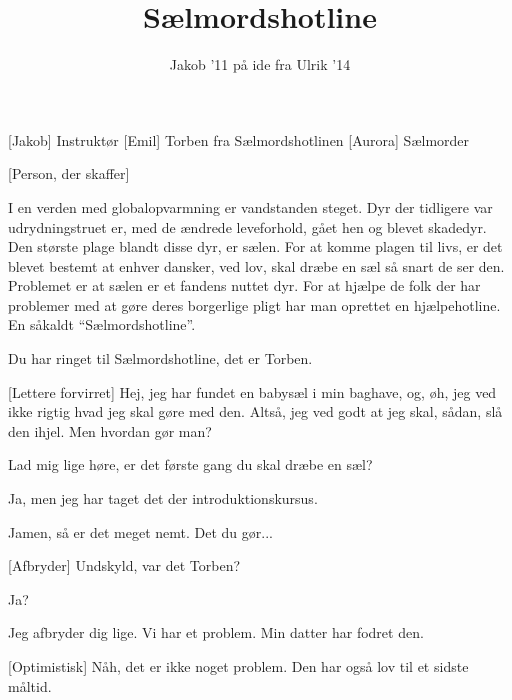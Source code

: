 \documentclass[a4paper,11pt]{article}
\title{Sælmordshotline}
\author{Jakob '11 på ide fra Ulrik '14}
\begin{document}
\maketitle

\begin{roles}
[Jakob] Instruktør
[Emil] Torben fra Sælmordshotlinen
[Aurora] Sælmorder
\end{roles}

\begin{props}
[Person, der skaffer]
\end{props}


\begin{sketch}


 I en verden med globalopvarmning er vandstanden steget. Dyr der tidligere var udrydningstruet er, med de ændrede leveforhold, gået hen og blevet skadedyr. 
Den største plage blandt disse dyr, er sælen. For at komme plagen til livs, er det blevet bestemt at enhver dansker, ved lov, skal dræbe en sæl så snart de ser den. Problemet er at sælen er et fandens nuttet dyr. For at hjælpe de folk der har problemer med at gøre deres borgerlige pligt har man oprettet en hjælpehotline. En såkaldt “Sælmordshotline”.


 Du har ringet til Sælmordshotline, det er Torben.

[Lettere forvirret] Hej, jeg har fundet en babysæl i min baghave, og, øh, jeg ved ikke rigtig hvad jeg skal gøre med den. Altså, jeg ved godt at jeg skal, sådan, slå den ihjel. Men hvordan gør man?

 Lad mig lige høre, er det første gang du skal dræbe en sæl?

 Ja, men jeg har taget det der introduktionskursus. 

 Jamen, så er det meget nemt. Det du gør... 

[Afbryder] Undskyld, var det Torben? 

 Ja?

 Jeg afbryder dig lige. Vi har et problem. Min datter har fodret den. 

[Optimistisk] Nåh, det er ikke noget problem. Den har også lov til et sidste måltid.


\end{sketch}
\end{document}
